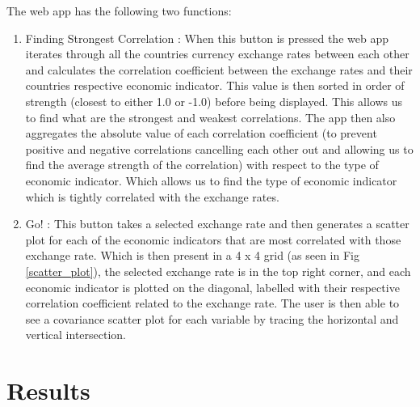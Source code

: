 The web app has the following two functions:
\newline
\begin{enumerate}
\item Finding Strongest Correlation : When this button is pressed the web app iterates through all the countries currency exchange rates between each other and calculates the correlation coefficient between the exchange rates and their countries respective economic indicator.  This value is then sorted in order of strength (closest to either 1.0 or -1.0) before being displayed.  This allows us to find what are the strongest and weakest correlations. The app then also aggregates the absolute value of each correlation coefficient (to prevent positive and negative correlations cancelling each other out and allowing us to find the average strength of the correlation) with respect to the type of economic indicator.  Which allows us to find the type of economic indicator which is tightly correlated with the exchange rates.

\item Go! : This button takes a selected exchange rate and then generates a scatter plot for each of the economic indicators that are most correlated with those exchange rate. Which is then present in a 4 x 4 grid (as seen in Fig \ref{scatter_plot}), the selected exchange rate is in the top right corner, and each economic indicator is plotted on the diagonal, labelled with their respective correlation coefficient related to the exchange rate.  The user is then able to see a covariance scatter plot for each variable by tracing the horizontal and vertical intersection.
\end{enumerate}

\section{Results}
